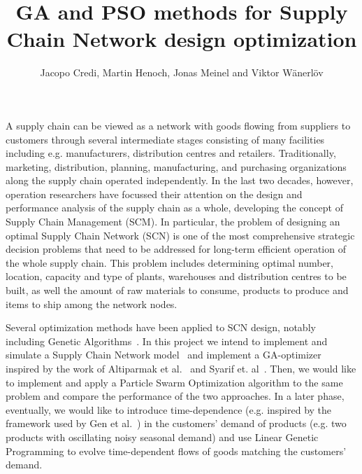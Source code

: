 \documentclass[11pt,a4paper]{article}
\author{Jacopo Credi, Martin Henoch, Jonas Meinel and Viktor W\"anerl\"ov}
\title{GA and PSO methods for Supply Chain Network design optimization}
\begin{document}
\maketitle

A supply chain can be viewed as a network with goods flowing from suppliers to customers through several intermediate stages consisting of many facilities including e.g. manufacturers, distribution centres and retailers. Traditionally, marketing, distribution, planning,
manufacturing, and purchasing organizations along the supply chain operated independently. In the last two decades, however, operation researchers have focussed their attention on the design and performance analysis of the supply chain as a whole, developing the concept of Supply Chain Management (SCM).
In particular, the problem of designing an optimal Supply Chain Network (SCN) is one of the most comprehensive strategic decision problems that need to be addressed for long-term efficient operation of the whole supply chain.
This problem includes determining optimal number, location, capacity and type of plants, warehouses and distribution centres to be built, as well the amount of raw materials to consume, products to produce and items to ship among the network nodes.

Several optimization methods have been applied to SCN design, notably including Genetic Algorithms~\cite{altiparmak2006genetic, syarif2002study}. In this project we intend to implement and simulate a Supply Chain Network model~\cite{amiri2006designing, jayaraman2001planning, syarif2002study} and implement a GA-optimizer inspired by the work of Altiparmak et al.~\cite{altiparmak2006genetic} and Syarif et. al~\cite{syarif2002study}. Then, we would like to implement and apply a Particle Swarm Optimization algorithm to
the same problem and compare the performance of the two approaches. In a later phase, eventually, we would like to introduce time-dependence (e.g. inspired by the framework used by Gen et al.~\cite{gen2005hybrid}) in the customers' demand of products (e.g. two products with oscillating noisy seasonal demand) and use Linear Genetic Programming to evolve time-dependent flows of goods matching the customers' demand.

 

\end{document}
